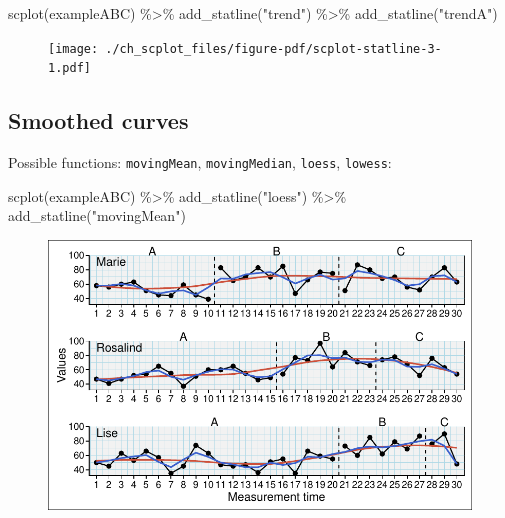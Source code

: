 \documentclass[
  letterpaper,
  DIV=11,
  numbers=noendperiod]{scrreprt}
\newenvironment{Shaded}{\begin{snugshade}}{\end{snugshade}}
\newcommand{\FunctionTok}[1]{\textcolor[rgb]{0.28,0.35,0.67}{#1}}
\newcommand{\NormalTok}[1]{\textcolor[rgb]{0.00,0.23,0.31}{#1}}
\newcommand{\SpecialCharTok}[1]{\textcolor[rgb]{0.37,0.37,0.37}{#1}}
\newcommand{\StringTok}[1]{\textcolor[rgb]{0.13,0.47,0.30}{#1}}
\begin{document}
\begin{Shaded}
\begin{Highlighting}[]
\FunctionTok{scplot}\NormalTok{(exampleABC) }\SpecialCharTok{\%\textgreater{}\%}
  \FunctionTok{add\_statline}\NormalTok{(}\StringTok{"trend"}\NormalTok{) }\SpecialCharTok{\%\textgreater{}\%}
  \FunctionTok{add\_statline}\NormalTok{(}\StringTok{"trendA"}\NormalTok{)}
\end{Highlighting}
\end{Shaded}

\begin{figure}[H]

{\centering \texttt{[image: ./ch\_scplot\_files/figure-pdf/scplot-statline-3-1.pdf]}

}

\end{figure}

\hypertarget{smoothed-curves}{%
\subsection{Smoothed curves}\label{smoothed-curves}}

Possible functions: \texttt{movingMean}, \texttt{movingMedian},
\texttt{loess}, \texttt{lowess}:

\begin{Shaded}
\begin{Highlighting}[]
\FunctionTok{scplot}\NormalTok{(exampleABC) }\SpecialCharTok{\%\textgreater{}\%}
  \FunctionTok{add\_statline}\NormalTok{(}\StringTok{"loess"}\NormalTok{) }\SpecialCharTok{\%\textgreater{}\%}
  \FunctionTok{add\_statline}\NormalTok{(}\StringTok{"movingMean"}\NormalTok{)}
\end{Highlighting}
\end{Shaded}

\begin{figure}[H]

{\centering \includegraphics{./ch_scplot_files/figure-pdf/scplot-statline-4-1.pdf}

}

\end{figure}
\end{document}
